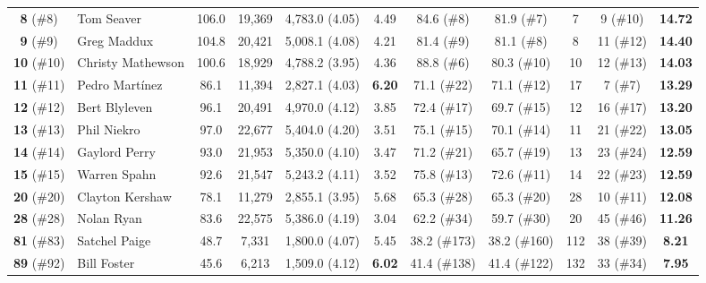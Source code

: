 \documentclass[11pt,letterpaper]{article}
\theoremstyle{plain}
\theoremstyle{definition}
\theoremstyle{remark}
\begin{document}
\begin{table}[htbp]
{\begin{tabular}{@{}clccccccccc@{}}
\textbf{8} (\#8) & Tom Seaver & 106.0 & 19,369 & 4,783.0 (4.05) & 4.49 & 84.6 (\#8) & 81.9 (\#7) & 7 & 9 (\#10) & \textbf{14.72} \\
\textbf{9} (\#9) & Greg Maddux & 104.8 & 20,421 & 5,008.1 (4.08) & 4.21 & 81.4 (\#9) & 81.1 (\#8) & 8 & 11 (\#12) & \textbf{14.40} \\
\textbf{10} (\#10) & Christy Mathewson & 100.6 & 18,929 & 4,788.2 (3.95) & 4.36 & 88.8 (\#6) & 80.3 (\#10) & 10 & 12 (\#13) & \textbf{14.03} \\
\textbf{11} (\#11) & Pedro Mart\'{i}nez & 86.1 & 11,394 & 2,827.1 (4.03) & \textbf{6.20} & 71.1 (\#22) & 71.1 (\#12) & 17 & 7 (\#7) & \textbf{13.29} \\
\textbf{12} (\#12) & Bert Blyleven & 96.1 & 20,491 & 4,970.0 (4.12) & 3.85 & 72.4 (\#17) & 69.7 (\#15) & 12 & 16 (\#17) & \textbf{13.20} \\
\textbf{13} (\#13) & Phil Niekro & 97.0 & 22,677 & 5,404.0 (4.20) & 3.51 & 75.1 (\#15) & 70.1 (\#14) & 11 & 21 (\#22) & \textbf{13.05} \\
\textbf{14} (\#14) & Gaylord Perry & 93.0 & 21,953 & 5,350.0 (4.10) & 3.47 & 71.2 (\#21) & 65.7 (\#19) & 13 & 23 (\#24) & \textbf{12.59} \\
\textbf{15} (\#15) & Warren Spahn & 92.6 & 21,547 & 5,243.2 (4.11) & 3.52 & 75.8 (\#13) & 72.6 (\#11) & 14 & 22 (\#23) & \textbf{12.59} \\
\midrule
\textbf{20} (\#20) & Clayton Kershaw & 78.1 & 11,279 & 2,855.1 (3.95) & 5.68 & 65.3 (\#28) & 65.3 (\#20) & 28 & 10 (\#11) & \textbf{12.08} \\
\textbf{28} (\#28) & Nolan Ryan & 83.6 & 22,575 & 5,386.0 (4.19) & 3.04 & 62.2 (\#34) & 59.7 (\#30) & 20 & 45 (\#46) & \textbf{11.26} \\
\textbf{81} (\#83) & Satchel Paige & 48.7 & 7,331 & 1,800.0 (4.07) & 5.45 & 38.2 (\#173) & 38.2 (\#160) & 112 & 38 (\#39) & \textbf{8.21} \\
\textbf{89} (\#92) & Bill Foster & 45.6 & 6,213 & 1,509.0 (4.12) & \textbf{6.02} & 41.4 (\#138) & 41.4 (\#122) & 132 & 33 (\#34) & \textbf{7.95} \\
\bottomrule
\end{tabular}%
}
\end{table}
\end{document}
